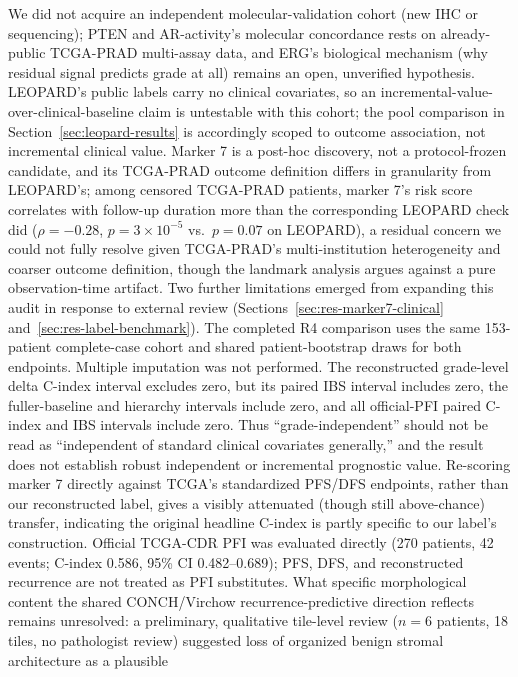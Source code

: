 We did not acquire an independent molecular-validation cohort (new IHC or sequencing);
PTEN and AR-activity's molecular concordance rests on already-public TCGA-PRAD multi-assay
data, and ERG's biological mechanism (why residual signal predicts grade at all) remains an
open, unverified hypothesis. LEOPARD's public labels carry no clinical covariates, so an
incremental-value-over-clinical-baseline claim is untestable with this cohort; the pool
comparison in Section~\ref{sec:leopard-results} is accordingly scoped to outcome association,
not incremental clinical value. Marker 7 is a post-hoc discovery, not a protocol-frozen
candidate, and its TCGA-PRAD outcome definition differs in granularity from LEOPARD's; among
censored TCGA-PRAD patients, marker 7's risk score correlates with follow-up duration more
than the corresponding LEOPARD check did ($\rho=-0.28$, $p=3\times10^{-5}$ vs.\ $p=0.07$ on
LEOPARD), a residual concern we could not fully resolve given TCGA-PRAD's multi-institution
heterogeneity and coarser outcome definition, though the landmark analysis argues against a
pure observation-time artifact. Two further limitations emerged from expanding this audit in
response to external review (Sections~\ref{sec:res-marker7-clinical}
and~\ref{sec:res-label-benchmark}). The completed R4 comparison uses the same 153-patient
complete-case cohort and shared patient-bootstrap draws for both endpoints. Multiple imputation
was not performed. The reconstructed grade-level delta C-index interval excludes zero, but its
paired IBS interval includes zero, the fuller-baseline and hierarchy intervals include zero,
and all official-PFI paired C-index and IBS intervals include zero. Thus ``grade-independent''
should not be read as ``independent of standard clinical covariates generally,'' and the result
does not establish robust independent or incremental prognostic value. Re-scoring marker 7
directly against TCGA's standardized PFS/DFS endpoints, rather than our
reconstructed label, gives a visibly attenuated (though still above-chance) transfer, indicating
the original headline C-index is partly specific to our label's construction. Official
TCGA-CDR PFI was evaluated directly (270 patients, 42 events; C-index 0.586, 95\% CI
0.482--0.689); PFS, DFS, and reconstructed recurrence are not treated as PFI substitutes.
What specific
morphological content the shared CONCH/Virchow recurrence-predictive direction reflects remains
unresolved: a preliminary, qualitative tile-level review ($n=6$ patients, 18 tiles, no
pathologist review) suggested loss of organized benign stromal architecture as a plausible
